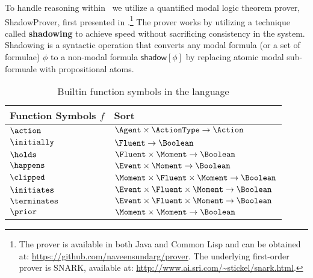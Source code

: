 
To handle reasoning within \DCEC\, we utilize a quantified modal logic
theorem prover, \textsf{ShadowProver}, first presented in
\cite{nsg_sb_dde_ijcai,uncertaintyized_cognitive_calculus}.\footnote{The
  prover is available in both Java and Common Lisp and can be obtained
  at: \url{https://github.com/naveensundarg/prover}. The underlying
  first-order prover is SNARK, available at:
  \url{http://www.ai.sri.com/~stickel/snark.html}.}  The prover works
by utilizing a technique called \textbf{shadowing} to achieve speed
without sacrificing consistency in the system.  Shadowing is a
syntactic operation that converts any modal formula (or a set of
formulae) $\phi$ to a non-modal formula $\mathsf{shadow}[\phi]$ by replacing atomic
modal sub-formuale with propositional atoms.

\begin{table}
\begin{footnotesize}
\begin{center}
\begin{tabular}{lp{10.3cm}}
\toprule
\textbf{Function Symbols} $f$& \textbf{Sort}  \\
\midrule
$\action$ & $\Agent \times \ActionType \rightarrow \Action$\\
$ \initially$ & $\Fluent \rightarrow \Boolean$\\
  $\holds$ & $ \Fluent \times \Moment \rightarrow \Boolean $\\
  $ \happens$ & $ \Event \times \Moment \rightarrow \Boolean$ \\
  $ \clipped$ & $ \Moment \times \Fluent \times \Moment \rightarrow \Boolean$ \\
  $ \initiates$ & $ \Event \times \Fluent \times \Moment \rightarrow \Boolean$\\
  $ \terminates$ & $ \Event \times \Fluent \times \Moment \rightarrow \Boolean$ \\
  $ \prior$ & $\Moment \times \Moment \rightarrow \Boolean$\\
\bottomrule
\end{tabular}
\caption{Builtin function symbols in the language}
\label{syn:defs}
\end{center}
\end{footnotesize}
\end{table}


